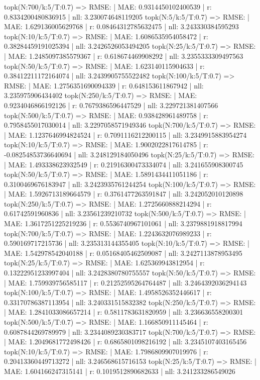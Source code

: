 topk(N:700/k:5/T:0.7) => RMSE: | MAE: 0.9314450102400539 | r: 0.8334200480836915 | nll: 3.230074648119205
topk(N:5/k:5/T:0.7) => RMSE: | MAE: 1.629136005629768 | r: 0.08464312785632475 | nll: 3.243330384595293
topk(N:10/k:5/T:0.7) => RMSE: | MAE: 1.6086535954058472 | r: 0.38284459191025394 | nll: 3.2426526053494205
topk(N:25/k:5/T:0.7) => RMSE: | MAE: 1.2485097385579367 | r: 0.618674469908292 | nll: 3.2355333309497563
topk(N:50/k:5/T:0.7) => RMSE: | MAE: 1.623140115904633 | r: 0.38412211172164074 | nll: 3.2439905755522482
topk(N:100/k:5/T:0.7) => RMSE: | MAE: 1.2756351690094339 | r: 0.648153611867942 | nll: 3.235975906434402
topk(N:250/k:5/T:0.7) => RMSE: | MAE: 0.9234046866192126 | r: 0.7679386596447529 | nll: 3.229721381407566
topk(N:500/k:5/T:0.7) => RMSE: | MAE: 0.938428961489758 | r: 0.7958455017030014 | nll: 3.2297058571949346
topk(N:700/k:5/T:0.7) => RMSE: | MAE: 1.1237646994824524 | r: 0.7091116212200115 | nll: 3.2349915883954274
topk(N:10/k:5/T:0.7) => RMSE: | MAE: 1.9002022817614785 | r: -0.08254853736640694 | nll: 3.248129184050496
topk(N:25/k:5/T:0.7) => RMSE: | MAE: 1.493338623932549 | r: 0.21916300473334074 | nll: 3.241655908300745
topk(N:50/k:5/T:0.7) => RMSE: | MAE: 1.5891434411051186 | r: 0.3100469676183947 | nll: 3.2423935761244254
topk(N:100/k:5/T:0.7) => RMSE: | MAE: 1.5926713189664579 | r: 0.3761477263591847 | nll: 3.242052010120898
topk(N:250/k:5/T:0.7) => RMSE: | MAE: 1.2725660888214294 | r: 0.61742591960836 | nll: 3.23561239210732
topk(N:500/k:5/T:0.7) => RMSE: | MAE: 1.3617251225219236 | r: 0.5536740967101061 | nll: 3.2379881918817994
topk(N:700/k:5/T:0.7) => RMSE: | MAE: 1.2243632076989233 | r: 0.590169717215736 | nll: 3.235313144355405
topk(N:10/k:5/T:0.7) => RMSE: | MAE: 1.542978542040188 | r: 0.05168405462509087 | nll: 3.2427113878953495
topk(N:25/k:5/T:0.7) => RMSE: | MAE: 1.625369943812954 | r: 0.13222951233997404 | nll: 3.2428380780755557
topk(N:50/k:5/T:0.7) => RMSE: | MAE: 1.759939756585117 | r: 0.21252595264764487 | nll: 3.2464392036294143
topk(N:100/k:5/T:0.7) => RMSE: | MAE: 1.4958526352446617 | r: 0.33170786387113954 | nll: 3.240331515832382
topk(N:250/k:5/T:0.7) => RMSE: | MAE: 1.2841033086657214 | r: 0.5811783631820959 | nll: 3.236636558200301
topk(N:500/k:5/T:0.7) => RMSE: | MAE: 1.166850911145464 | r: 0.6087844269789979 | nll: 3.2344089230383717
topk(N:700/k:5/T:0.7) => RMSE: | MAE: 1.2049681772498426 | r: 0.6865801098216192 | nll: 3.2345107403165456
topk(N:10/k:5/T:0.7) => RMSE: | MAE: 1.7986809907019976 | r: 0.20413360449713272 | nll: 3.246568615716153
topk(N:25/k:5/T:0.7) => RMSE: | MAE: 1.604166247315141 | r: 0.1019512890682633 | nll: 3.241233286549026
